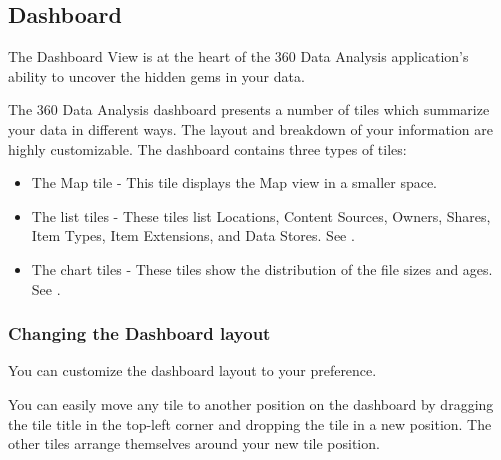 \documentclass[letterpaper,10pt,english]{sphinxmanual}
\begin{document}
\subsection{Dashboard}
\label{\detokenize{mcdmp_app_ug:dashboard}}
The Dashboard View is at the heart of the 360 Data Analysis application’s ability to uncover the hidden gems in your data.
\begin{quote}

\begin{figure}[htbp]
\centering

\noindent{}
\end{figure}
\end{quote}

The 360 Data Analysis dashboard presents a number of tiles which summarize your data in different ways. The layout and breakdown of your information are highly customizable.
The dashboard contains three types of tiles:
\begin{itemize}
\item {} 
The Map tile - This tile displays the Map view in a smaller space.

\item {} 
The list tiles - These tiles list Locations, Content Sources, Owners, Shares, Item Types, Item Extensions, and Data Stores. See {\hyperref[\detokenize{mcdmp_app_ug:list-titles}]{}}.

\item {} 
The chart tiles - These tiles show the distribution of the file sizes and ages. See {\hyperref[\detokenize{mcdmp_app_ug:chart-tiles}]{}}.

\end{itemize}


\subsubsection{Changing the Dashboard layout}
\label{\detokenize{mcdmp_app_ug:changing-the-dashboard-layout}}
You can customize the dashboard layout to your preference.


You can easily move any tile to another position on the dashboard by dragging the tile title in the top-left corner and dropping the tile in a new position. The other tiles arrange themselves around your new tile position.
\end{document}
